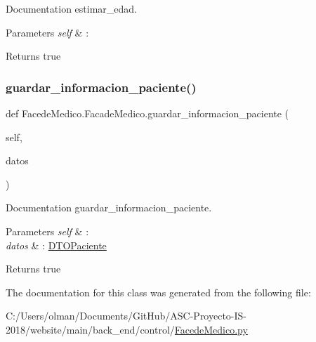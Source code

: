 Documentation estimar\+\_\+edad. 


\begin{DoxyParams}{Parameters}
{\em self} & \+: \\
\hline
\end{DoxyParams}
\begin{DoxyReturn}{Returns}
true 
\end{DoxyReturn}
\mbox{\label{class_facede_medico_1_1_facade_medico_a8f1f5c7f6bf4689f905e8aa6e60f45e2}} 
\subsubsection{\texorpdfstring{guardar\+\_\+informacion\+\_\+paciente()}{guardar\_informacion\_paciente()}}
{\footnotesize\ttfamily def Facede\+Medico.\+Facade\+Medico.\+guardar\+\_\+informacion\+\_\+paciente (\begin{DoxyParamCaption}\item[{}]{self,  }\item[{}]{datos }\end{DoxyParamCaption})}



Documentation guardar\+\_\+informacion\+\_\+paciente. 


\begin{DoxyParams}{Parameters}
{\em self} & \+: \\
\hline
{\em datos} & \+: \mbox{\hyperlink{namespace_d_t_o_paciente}{D\+T\+O\+Paciente}} \\
\hline
\end{DoxyParams}
\begin{DoxyReturn}{Returns}
true 
\end{DoxyReturn}


The documentation for this class was generated from the following file\+:\begin{DoxyCompactItemize}
\item 
C\+:/\+Users/olman/\+Documents/\+Git\+Hub/\+A\+S\+C-\/\+Proyecto-\/\+I\+S-\/2018/website/main/back\+\_\+end/control/\mbox{\hyperlink{_facede_medico_8py}{Facede\+Medico.\+py}}\end{DoxyCompactItemize}
